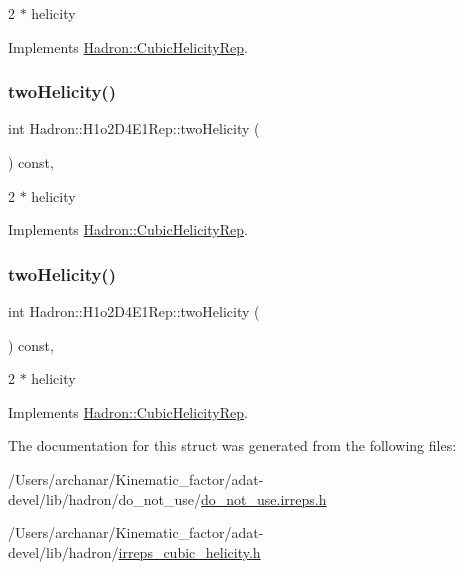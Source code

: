 2 $\ast$ helicity 

Implements \mbox{\hyperlink{structHadron_1_1CubicHelicityRep_af507aa56fc2747eacc8cb6c96db31ecc}{Hadron\+::\+Cubic\+Helicity\+Rep}}.

\mbox{\label{structHadron_1_1H1o2D4E1Rep_aaf66515136803b1657682ffac0d07ce9}} 
\subsubsection{\texorpdfstring{twoHelicity()}{twoHelicity()}\hspace{0.1cm}{\footnotesize\ttfamily [2/3]}}
{\footnotesize\ttfamily int Hadron\+::\+H1o2\+D4\+E1\+Rep\+::two\+Helicity (\begin{DoxyParamCaption}{ }\end{DoxyParamCaption}) const\hspace{0.3cm}{\ttfamily [inline]}, {\ttfamily [virtual]}}

2 $\ast$ helicity 

Implements \mbox{\hyperlink{structHadron_1_1CubicHelicityRep_af507aa56fc2747eacc8cb6c96db31ecc}{Hadron\+::\+Cubic\+Helicity\+Rep}}.

\mbox{\label{structHadron_1_1H1o2D4E1Rep_aaf66515136803b1657682ffac0d07ce9}} 
\subsubsection{\texorpdfstring{twoHelicity()}{twoHelicity()}\hspace{0.1cm}{\footnotesize\ttfamily [3/3]}}
{\footnotesize\ttfamily int Hadron\+::\+H1o2\+D4\+E1\+Rep\+::two\+Helicity (\begin{DoxyParamCaption}{ }\end{DoxyParamCaption}) const\hspace{0.3cm}{\ttfamily [inline]}, {\ttfamily [virtual]}}

2 $\ast$ helicity 

Implements \mbox{\hyperlink{structHadron_1_1CubicHelicityRep_af507aa56fc2747eacc8cb6c96db31ecc}{Hadron\+::\+Cubic\+Helicity\+Rep}}.



The documentation for this struct was generated from the following files\+:\begin{DoxyCompactItemize}
\item 
/\+Users/archanar/\+Kinematic\+\_\+factor/adat-\/devel/lib/hadron/do\+\_\+not\+\_\+use/\mbox{\hyperlink{adat-devel_2lib_2hadron_2do__not__use_2do__not__use_8irreps_8h}{do\+\_\+not\+\_\+use.\+irreps.\+h}}\item 
/\+Users/archanar/\+Kinematic\+\_\+factor/adat-\/devel/lib/hadron/\mbox{\hyperlink{adat-devel_2lib_2hadron_2irreps__cubic__helicity_8h}{irreps\+\_\+cubic\+\_\+helicity.\+h}}\end{DoxyCompactItemize}
